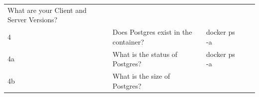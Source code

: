 \documentclass[]{book}
\theoremstyle{definition}
\theoremstyle{definition}
\theoremstyle{definition}
\theoremstyle{remark}
\begin{document}
\begin{longtable}[]{@{}lllll@{}}
\begin{minipage}[t]{0.19\columnwidth}
What are your Client and Server Versions?\strut
\end{minipage} & \begin{minipage}[t]{0.29\columnwidth}\raggedright
\strut
\end{minipage} & \begin{minipage}[t]{0.20\columnwidth}\raggedright
\strut
\end{minipage} & \begin{minipage}[t]{0.16\columnwidth}\raggedright
\strut
\end{minipage}\tabularnewline
\begin{minipage}[t]{0.02\columnwidth}\raggedright
4\strut
\end{minipage} & \begin{minipage}[t]{0.19\columnwidth}\raggedright
Does Postgres exist in the container?\strut
\end{minipage} & \begin{minipage}[t]{0.29\columnwidth}\raggedright
docker ps -a\strut
\end{minipage} & \begin{minipage}[t]{0.20\columnwidth}\raggedright
\strut
\end{minipage} & \begin{minipage}[t]{0.16\columnwidth}\raggedright
\strut
\end{minipage}\tabularnewline
\begin{minipage}[t]{0.02\columnwidth}\raggedright
4a\strut
\end{minipage} & \begin{minipage}[t]{0.19\columnwidth}\raggedright
What is the status of Postgres?\strut
\end{minipage} & \begin{minipage}[t]{0.29\columnwidth}\raggedright
docker ps -a\strut
\end{minipage} & \begin{minipage}[t]{0.20\columnwidth}\raggedright
\strut
\end{minipage} & \begin{minipage}[t]{0.16\columnwidth}\raggedright
\strut
\end{minipage}\tabularnewline
\begin{minipage}[t]{0.02\columnwidth}\raggedright
4b\strut
\end{minipage} & \begin{minipage}[t]{0.19\columnwidth}\raggedright
What is the size of Postgres?\strut
\end{minipage} & \begin{minipage}[t]{0.29\columnwidth}\raggedright

\end{minipage}
\end{longtable}
\end{document}
